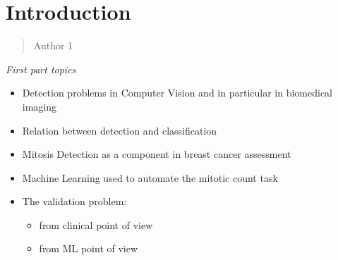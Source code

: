 \setcounter{page}{1}

\chapter{Introduction}
\label{Introduction}
\thispagestyle{empty}

\begin{quotation}
{\footnotesize
{}
\begin{flushright}
Author 1
\end{flushright}
}
\end{quotation}
\vspace{0.5cm}




\emph{First part topics}

\begin{itemize}
\item Detection problems in Computer Vision and in particular in biomedical imaging
\item Relation between detection and classification
\item Mitosis Detection as a component in breast cancer assessment
\item Machine Learning used to automate the mitotic count task
\item The validation problem:
	\begin{itemize}
	\item from clinical point of view
	\item from ML point of view
	\end{itemize}
\end{itemize}

